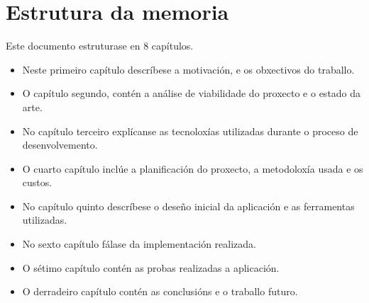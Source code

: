 \section{Estrutura da memoria}
Este documento estruturase en 8 capítulos.
\begin{itemize}
	\item Neste primeiro capítulo descríbese a motivación, e os obxectivos do traballo.
	\item O capítulo segundo, contén a análise de viabilidade do proxecto e o estado da arte.
	\item No capítulo terceiro explícanse as tecnoloxías utilizadas durante o proceso de desenvolvemento.
	\item O cuarto capítulo inclúe a planificación do proxecto, a metodoloxía usada e os custos.
	\item No capítulo quinto descríbese o deseño inicial da aplicación e as ferramentas utilizadas.
	\item No sexto capítulo fálase da implementación realizada.
	\item O sétimo capítulo contén as probas realizadas a aplicación.
	\item O derradeiro capítulo contén as conclusións e o traballo futuro.
\end{itemize}
